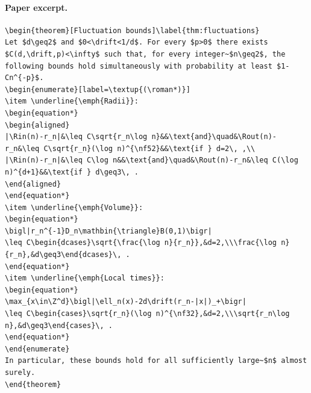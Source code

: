 \paragraph{Paper excerpt.}
\begin{verbatim}
\begin{theorem}[Fluctuation bounds]\label{thm:fluctuations}
Let $d\geq2$ and $0<\drift<1/d$. For every $p>0$ there exists $C(d,\drift,p)<\infty$ such that, for every integer~$n\geq2$, the following bounds hold simultaneously with probability at least $1-Cn^{-p}$.
\begin{enumerate}[label=\textup{(\roman*)}]
\item \underline{\emph{Radii}}:
\begin{equation*}
\begin{aligned}
|\Rin(n)-r_n|&\leq C\sqrt{r_n\log n}&&\text{and}\quad&\Rout(n)-r_n&\leq C\sqrt{r_n}(\log n)^{\nf52}&&\text{if } d=2\, ,\\
|\Rin(n)-r_n|&\leq C\log n&&\text{and}\quad&\Rout(n)-r_n&\leq C(\log n)^{d+1}&&\text{if } d\geq3\, .
\end{aligned}
\end{equation*}
\item \underline{\emph{Volume}}:
\begin{equation*}
\bigl|r_n^{-1}D_n\mathbin{\triangle}B(0,1)\bigr|
\leq C\begin{dcases}\sqrt{\frac{\log n}{r_n}},&d=2,\\\frac{\log n}{r_n},&d\geq3\end{dcases}\, .
\end{equation*}
\item \underline{\emph{Local times}}:
\begin{equation*}
\max_{x\in\Z^d}\bigl|\ell_n(x)-2d\drift(r_n-|x|)_+\bigr|
\leq C\begin{cases}\sqrt{r_n}(\log n)^{\nf32},&d=2,\\\sqrt{r_n\log n},&d\geq3\end{cases}\, .
\end{equation*}
\end{enumerate}
In particular, these bounds hold for all sufficiently large~$n$ almost surely.
\end{theorem}
\end{verbatim}
